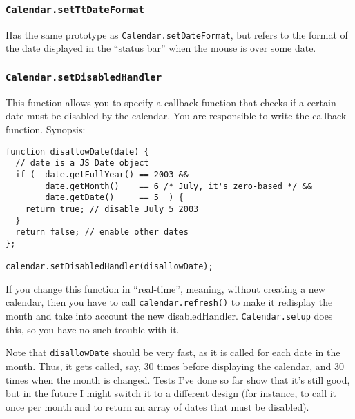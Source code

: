 \documentclass[a4paper,10pt]{article}
\begin{document}

\subsubsection{\texttt{Calendar.setTtDateFormat}}\label{sec:Calendar.setTtDateFormat}

Has the same prototype as \texttt{Calendar.setDateFormat}, but refers to the
format of the date displayed in the ``status bar'' when the mouse is over some
date.

\subsubsection{\texttt{Calendar.setDisabledHandler}}\label{sec:Calendar.setDisabledHandler}

This function allows you to specify a callback function that checks if a
certain date must be disabled by the calendar.  You are responsible to write
the callback function.  Synopsis:

\begin{verbatim}
function disallowDate(date) {
  // date is a JS Date object
  if (  date.getFullYear() == 2003 &&
        date.getMonth()    == 6 /* July, it's zero-based */ &&
        date.getDate()     == 5  ) {
    return true; // disable July 5 2003
  }
  return false; // enable other dates
};

calendar.setDisabledHandler(disallowDate);
\end{verbatim}

If you change this function in ``real-time'', meaning, without creating a new
calendar, then you have to call \texttt{calendar.refresh()} to make it
redisplay the month and take into account the new disabledHandler.
\texttt{Calendar.setup} does this, so you have no such trouble with it.

Note that \texttt{disallowDate} should be very fast, as it is called for each
date in the month.  Thus, it gets called, say, 30 times before displaying the
calendar, and 30 times when the month is changed.  Tests I've done so far show
that it's still good, but in the future I might switch it to a different design
(for instance, to call it once per month and to return an array of dates that
must be disabled).
\end{document}
